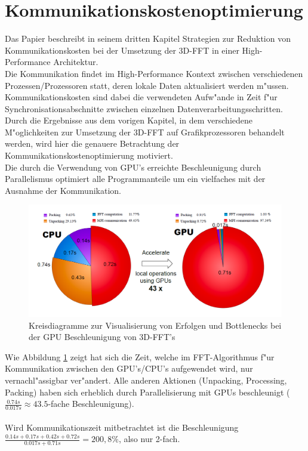 \section{Kommunikationskostenoptimierung}
Das Papier \cite[Kap.3]{mainpaper} beschreibt in seinem dritten Kapitel Strategien zur Reduktion von Kommunikationskosten bei der Umsetzung der 3D-FFT in einer High-Performance Architektur.\\

Die Kommunikation findet im High-Performance Kontext zwischen verschiedenen Prozessen/Prozessoren statt, deren lokale Daten aktualisiert werden m"ussen.\\
Kommunikationskosten sind dabei die verwendeten Aufw"ande in Zeit f"ur Synchronisationsabschnitte zwischen einzelnen Datenverarbeitungsschritten.\\

Durch die Ergebnisse aus dem vorigen Kapitel, in dem verschiedene M"oglichkeiten zur Umsetzung der 3D-FFT auf Grafikprozessoren behandelt werden, wird hier die genauere Betrachtung der Kommunikationskostenoptimierung motiviert.\\

Die durch die Verwendung von GPU's erreichte Beschleunigung durch Parallelismus optimiert alle Programmanteile um ein vielfaches mit der Ausnahme der Kommunikation.\\

\begin{figure}
\centering
  \includegraphics[width=\linewidth]{res/speedup.png}
  \caption{\cite[Abb. 3]{mainpaper} Kreisdiagramme zur Visualisierung von Erfolgen und Bottlenecks bei der GPU Beschleunigung von 3D-FFT's}
  \label{fig:speedup}
\end{figure}

Wie Abbildung \ref{fig:speedup} zeigt hat sich die Zeit, welche im FFT-Algorithmus f"ur Kommunikation zwischen den GPU's/CPU's aufgewendet wird, nur vernachl"assigbar ver"andert. Alle anderen Aktionen (Unpacking, Processing, Packing) haben sich erheblich durch Parallelisierung mit GPUs beschleunigt ($ \frac{0.74s}{0.017s} \approx 43.5$-fache Beschleunigung).\\
\\
Wird Kommunikationszeit mitbetrachtet ist die Beschleunigung $\frac{0.14s+0.17s+0.42s+0.72s}{0.017s+0.71s}=200,8\%$, also nur 2-fach.

